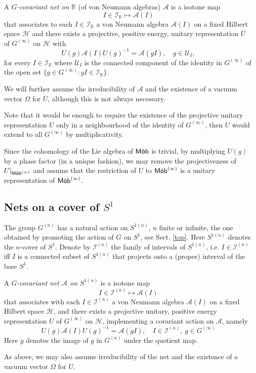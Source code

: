 \documentclass[11pt]{article}
\def\A{{\cal A}}
\def\I{{\cal I}}
\def\H{{\cal H}}
\def\U{{\cal U}}
\def\Mob{{\rm\textsf{M\"ob}}}
\def\Sn{S^{1(n)}}
\def\A{{\mathcal A}}
\def\H{{\mathcal H}}
\def\I{{\mathcal I}}
\def\U{{\mathcal U}}
\begin{document}
A \emph{ $G$-covariant net on $\mathbb R$} (of von Neumann algebras) $\A$ is a isotone map 
\[
I\in\I_{\mathbb R}\mapsto\A(I)
\]
that associates to each $I\in\I_{\mathbb R}$ a von Neumann algebra $\A(I)$ on a fixed Hilbert space $\H$ and there exists a projective, positive energy, unitary representation $U$ of $G^{(\infty)}$ on 
$\H$ with
\[
U(g)\A(I)U(g)^{-1} = \A(\dot{g} I), \quad g\in\U_I,
\]
for every $I\in\I_{\mathbb R}$ where $\U_I$ is the connected component of the identity in $G^{(\infty)}$ of the open set $\{g\in G^{(\infty)}: gI\in\I_{\mathbb R}\}$.

We will further assume the irreducibility of $\A$ and the existence of a vacuum vector $\Omega$ for $U$, although this is not always necessary.

Note that it would be enough to require the existence of the projective unitary representation $U$ only in a neighbourhood of the identity of $G^{(\infty)}$, then $U$ would extend to all $G^{(\infty)}$ by multiplicativity.

Since the cohomology of the Lie algebra of $\Mob$ is trivial, 
by multiplying $U(g)$ by a phase factor (in a unique fashion), we may remove the 
projectiveness of $U|_{\Mob^{(\infty)}}$ and assume that the restriction of $U$ to $\Mob^{(\infty)}$
is a unitary representation of $\Mob^{(\infty)}$. 
%
\subsection{Nets on a cover of $S^1$}
\label{coverNets}
The group $G^{(n)}$ has a natural action on $\Sn$, $n$ finite or infinite, the one obtained by promoting the action of $G$ on $S^1$, see Sect. \ref{top}. Here $\Sn$ denotes the $n$-cover of $S^1$. Denote by $\I^{(n)}$ the family of intervals of $\Sn$, i.e. $I\in\I^{(n)}$ iff $I$ is a connected subset of $\Sn$ that projects onto a (proper) interval of the base $S^1$.

A \emph{$G$-covariant net $\A$ on $\Sn$} is a isotone map 
\[
I\in\I^{(n)}\mapsto\A(I)
\]
that associates with each $I\in\I^{(n)}$ a von Neumann algebra $\A(I)$ on a fixed Hilbert space $\H$, and there exists a projective
unitary, positive energy representation $U$ of $G^{(\infty)}$ on 
$\H$, implementing a  covariant action on $\A$, namely 
\[
U(g)\A(I)U(g)^{-1} = \A(\dot{g}I),\quad  I\in \I^{(n)},\ 
g\in G^{(\infty)}
\]
Here $\dot{g}$ denotes the image of $g$ in $G^{(n)}$ under the quotient map.

As above, we may also assume irreducibility of the net and the existence of a vacuum vector $\Omega$ for $U$.
\end{document}
